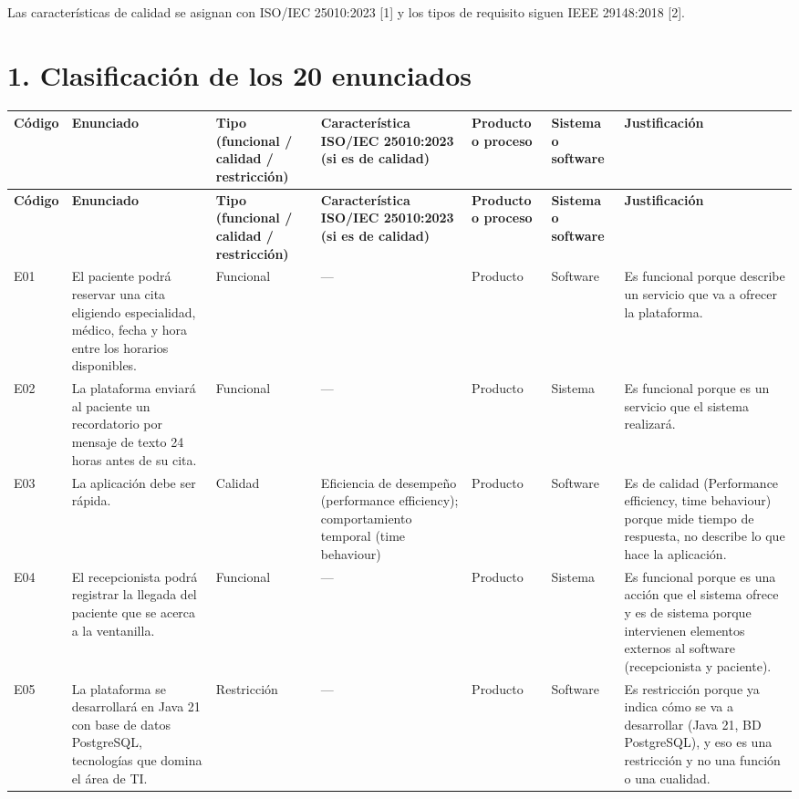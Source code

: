 \documentclass[10pt,letterpaper,landscape]{article}
\begin{document}
Las caracter\'isticas de calidad se asignan con ISO/IEC 25010:2023 [1] y los tipos de requisito siguen IEEE 29148:2018 [2].\section*{1. Clasificaci\'on de los 20 enunciados}
\begingroup\footnotesize\setlength{\tabcolsep}{3pt}\renewcommand{\arraystretch}{1.15}
\begin{longtable}{>{\raggedright\arraybackslash}p{1.25cm}>{\raggedright\arraybackslash}p{4.6cm}>{\raggedright\arraybackslash}p{2.1cm}>{\raggedright\arraybackslash}p{3.2cm}>{\raggedright\arraybackslash}p{1.6cm}>{\raggedright\arraybackslash}p{1.8cm}>{\raggedright\arraybackslash}p{8.5cm}}
\rowcolor{hdr}\textbf{Código} & \textbf{Enunciado} & \textbf{Tipo (funcional / calidad / restricción)} & \textbf{Característica ISO/IEC 25010:2023 (si es de calidad)} & \textbf{Producto o proceso} & \textbf{Sistema o software} & \textbf{Justificación} \\ \hline
\endfirsthead
\rowcolor{hdr}\textbf{Código} & \textbf{Enunciado} & \textbf{Tipo (funcional / calidad / restricción)} & \textbf{Característica ISO/IEC 25010:2023 (si es de calidad)} & \textbf{Producto o proceso} & \textbf{Sistema o software} & \textbf{Justificación} \\ \hline
\endhead
E01 & El paciente podrá reservar una cita eligiendo especialidad, médico, fecha y hora entre los horarios disponibles. & Funcional & --- & Producto & Software & Es funcional porque describe un servicio que va a ofrecer la plataforma. \\ \hline
E02 & La plataforma enviará al paciente un recordatorio por mensaje de texto 24 horas antes de su cita. & Funcional & --- & Producto & Sistema & Es funcional porque es un servicio que el sistema realizará. \\ \hline
E03 & La aplicación debe ser rápida. & Calidad & Eficiencia de desempeño (performance efficiency); comportamiento temporal (time behaviour) & Producto & Software & Es de calidad (Performance efficiency, time behaviour) porque mide tiempo de respuesta, no describe lo que hace la aplicación. \\ \hline
E04 & El recepcionista podrá registrar la llegada del paciente que se acerca a la ventanilla. & Funcional & --- & Producto & Sistema & Es funcional porque es una acción que el sistema ofrece y es de sistema porque intervienen elementos externos al software (recepcionista y paciente). \\ \hline
E05 & La plataforma se desarrollará en Java 21 con base de datos PostgreSQL, tecnologías que domina el área de TI. & Restricción & --- & Producto & Software & Es restricción porque ya indica cómo se va a desarrollar (Java 21, BD PostgreSQL), y eso es una restricción y no una función o una cualidad. \\ \hline

\end{longtable}
\end{document}
